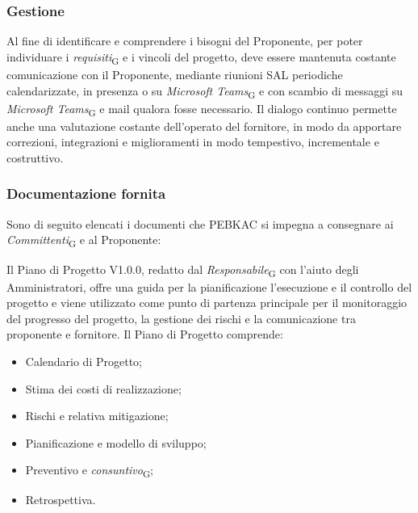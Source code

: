 \subsubsection{Gestione}
Al fine di identificare e comprendere i bisogni del Proponente, per poter individuare i \textit{requisiti}\textsubscript{G} e i vincoli del progetto, deve essere mantenuta costante comunicazione con il Proponente, mediante riunioni SAL periodiche calendarizzate, in presenza o su \textit{Microsoft Teams}\textsubscript{G} e con scambio di messaggi su \textit{Microsoft Teams}\textsubscript{G} e mail qualora fosse necessario. Il dialogo continuo permette anche una valutazione costante dell'operato del fornitore, in modo da apportare correzioni, integrazioni e miglioramenti in modo tempestivo, incrementale e costruttivo.

\subsubsection{Documentazione fornita}
Sono di seguito elencati i documenti che PEBKAC si impegna a consegnare ai \textit{Committenti}\textsubscript{G} e al Proponente: 

Il Piano di Progetto V1.0.0, redatto dal \textit{Responsabile}\textsubscript{G} con l'aiuto degli Amministratori, offre una guida per la pianificazione l'esecuzione e il controllo del progetto e viene utilizzato come punto di partenza principale per il monitoraggio del progresso del progetto, la gestione dei rischi e la comunicazione tra proponente e fornitore.
Il Piano di Progetto comprende:
    \begin{itemize}
        \item Calendario di Progetto;
        \item Stima dei costi di realizzazione;
        \item Rischi e relativa mitigazione;
        \item Pianificazione e modello di sviluppo;
        \item Preventivo e \textit{consuntivo}\textsubscript{G};
        \item Retrospettiva.
    \end{itemize}

